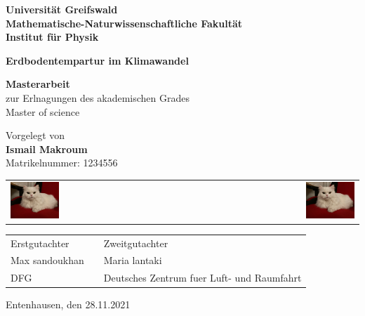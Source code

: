\documentclass[ngerman,12pt]{scrreprt}
\begin{document}
\begin{titlepage}
\begin{center}
\textbf{\large Universität Greifswald\\
Mathematische-Naturwissenschaftliche Fakultät\\
Institut für Physik}
\end{center}\vspace*{2cm}

\begin{center}
{\bfseries \huge Erdbodentempartur im Klimawandel}
\end{center}\vspace*{2cm}

\begin{center}
{\large{\bfseries   Masterarbeit} \\ zur Erlnagungen des akademischen Grades \\ Master of science}
\end{center}\vspace*{1cm}

\begin{center}
{Vorgelegt von \\ \textbf{ Ismail Makroum} \\ Matrikelnummer: 1234556}
\end{center}\vspace*{1cm}

\begin{tabular}{lp{3cm}r}
\includegraphics[width=0.3\textwidth]{Katze2} & & 
\includegraphics[width=0.3\textwidth]{Katze2}
\end{tabular}\vspace*{1cm}

\begin{tabular}{lp{}l}
Erstgutachter & & Zweitgutachter \\
Max sandoukhan & & Maria lantaki \\
DFG & & Deutsches Zentrum fuer Luft- und Raumfahrt
\end{tabular}\vspace*{1,5cm}

\begin{center}
Entenhausen, den 28.11.2021
\end{center}
\end{titlepage}
\end{document}
